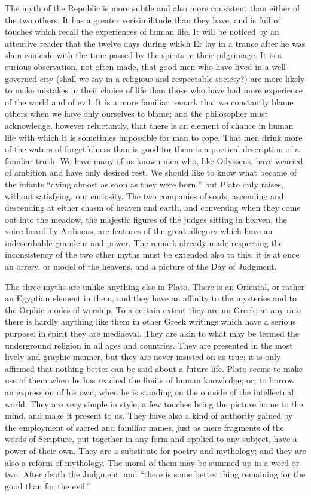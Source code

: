 \documentclass[11pt,letter]{article}
\begin{document}
\par  The myth of the Republic is more subtle and also more consistent than either of the two others. It has a greater verisimilitude than they have, and is full of touches which recall the experiences of human life. It will be noticed by an attentive reader that the twelve days during which Er lay in a trance after he was slain coincide with the time passed by the spirits in their pilgrimage. It is a curious observation, not often made, that good men who have lived in a well-governed city (shall we say in a religious and respectable society?) are more likely to make mistakes in their choice of life than those who have had more experience of the world and of evil. It is a more familiar remark that we constantly blame others when we have only ourselves to blame; and the philosopher must acknowledge, however reluctantly, that there is an element of chance in human life with which it is sometimes impossible for man to cope. That men drink more of the waters of forgetfulness than is good for them is a poetical description of a familiar truth. We have many of us known men who, like Odysseus, have wearied of ambition and have only desired rest. We should like to know what became of the infants “dying almost as soon as they were born,” but Plato only raises, without satisfying, our curiosity. The two companies of souls, ascending and descending at either chasm of heaven and earth, and conversing when they come out into the meadow, the majestic figures of the judges sitting in heaven, the voice heard by Ardiaeus, are features of the great allegory which have an indescribable grandeur and power. The remark already made respecting the inconsistency of the two other myths must be extended also to this: it is at once an orrery, or model of the heavens, and a picture of the Day of Judgment.

\par  The three myths are unlike anything else in Plato. There is an Oriental, or rather an Egyptian element in them, and they have an affinity to the mysteries and to the Orphic modes of worship. To a certain extent they are un-Greek; at any rate there is hardly anything like them in other Greek writings which have a serious purpose; in spirit they are mediaeval. They are akin to what may be termed the underground religion in all ages and countries. They are presented in the most lively and graphic manner, but they are never insisted on as true; it is only affirmed that nothing better can be said about a future life. Plato seems to make use of them when he has reached the limits of human knowledge; or, to borrow an expression of his own, when he is standing on the outside of the intellectual world. They are very simple in style; a few touches bring the picture home to the mind, and make it present to us. They have also a kind of authority gained by the employment of sacred and familiar names, just as mere fragments of the words of Scripture, put together in any form and applied to any subject, have a power of their own. They are a substitute for poetry and mythology; and they are also a reform of mythology. The moral of them may be summed up in a word or two: After death the Judgment; and “there is some better thing remaining for the good than for the evil.”
\end{document}
